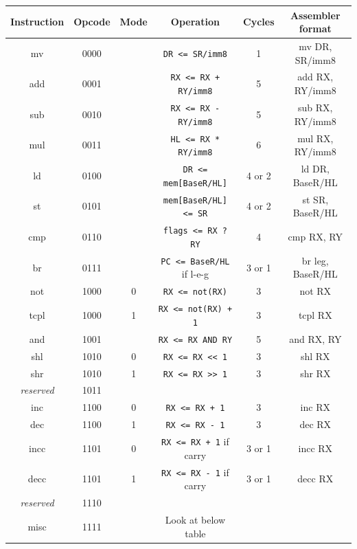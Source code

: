 \documentclass[13pt,a4paper]{report}
\begin{document}
\begin{center}
\begin{tabular}{|c|c|c|c|c|c|}
\hline 
Instruction & Opcode & Mode & Operation & Cycles & Assembler format \\ 
\hline 
mv & 0000 & & \texttt{DR <= SR/imm8} & 1 & mv DR, SR/imm8 \\ \hline 
add & 0001 & & \texttt{RX <= RX + RY/imm8} & 5 & add RX, RY/imm8 \\ \hline 
sub & 0010 & & \texttt{RX <= RX - RY/imm8} & 5 & sub RX, RY/imm8 \\ \hline
mul & 0011 & & \texttt{HL <= RX * RY/imm8} & 6 & mul RX, RY/imm8 \\ \hline 
ld & 0100 & & \texttt{DR <= mem[BaseR/HL]} & 4 or 2 & ld DR, BaseR/HL \\ \hline 
st & 0101 & & \texttt{mem[BaseR/HL] <= SR} & 4 or 2 & st SR, BaseR/HL \\ \hline 
cmp & 0110 & & \texttt{flags <= RX ? RY} & 4 & cmp RX, RY \\ \hline 
br & 0111 & & \texttt{PC <= BaseR/HL} if l-e-g & 3 or 1 & br leg, BaseR/HL \\ \hline
not & 1000 & 0 & \texttt{RX <= not(RX)} & 3 & not RX \\ \hline
tcpl & 1000 & 1 & \texttt{RX <= not(RX) + 1} & 3 & tcpl RX \\ \hline
and & 1001 & & \texttt{RX <= RX AND RY} & 5 & and RX, RY \\ \hline 
shl & 1010 & 0 & \texttt{RX <= RX << 1} & 3 & shl RX \\ \hline
shr & 1010 & 1 & \texttt{RX <= RX >> 1} & 3 & shr RX \\ \hline
\textit{reserved} & 1011 &  &  &  &  \\ \hline
inc & 1100 & 0 & \texttt{RX <= RX + 1} & 3 & inc RX \\ \hline
dec & 1100 & 1 & \texttt{RX <= RX - 1} & 3 & dec RX \\ \hline
incc & 1101 & 0 & \texttt{RX <= RX + 1} if carry & 3 or 1 & incc RX \\ \hline
decc & 1101 & 1 & \texttt{RX <= RX - 1} if carry & 3 or 1 & decc RX \\ \hline
\textit{reserved} & 1110 &  &  &  &  \\ \hline
misc & 1111 & & Look at below table &  & \\ \hline 
\end{tabular}
\end{center}
\end{document}
